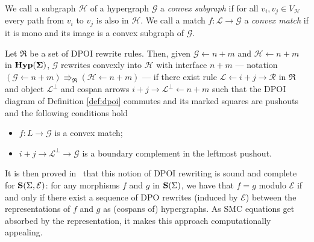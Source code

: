 \begin{definition}
We call a subgraph $\mathcal{H}$ of a hypergraph $\mathcal{G}$ a \emph{convex subgraph} if for all $v_i, v_j \in V_{\mathcal{H}}$ every path from $v_i$ to $v_j$ is also in $\mathcal{H}$.
We call a match $f : \mathcal L \to \mathcal G$ a \emph{convex match} if it is mono and its image is a convex subgraph of $\mathcal G$. 
   
\end{definition}

\begin{definition}
\label{def:convex_dpo}
Let $\mathfrak{R}$ be a set of DPOI rewrite rules. 
Then, given $\mathcal G \xleftarrow{} n+m$ and $\mathcal H \xleftarrow{} n + m$ in $\mathbf{Hyp(\Sigma)}$, $\mathcal G$ rewrites convexly into $\mathcal H$ with interface $n + m$ --- notation $(\mathcal G \xleftarrow{} n + m ) \Rrightarrow_{\mathfrak{R}}  (\mathcal H \xleftarrow{} n + m )$ --- if there exist rule $\mathcal L \xleftarrow{} i + j \xrightarrow{} \mathcal R$ in $\mathfrak{R}$ and object $\mathcal{L}^{\bot}$ and cospan arrows $i+j \xrightarrow{} \mathcal{L}^{\bot} \xleftarrow{} n+m$ such that the DPOI diagram of Definition \ref{def:dpoi} commutes and its marked squares are pushouts 
and the following conditions hold
\begin{itemize}
    \item $f : L \to \mathcal G$ is a convex match;
    \item $i + j \to \mathcal{L}^{\bot} \to \mathcal G$ is a boundary complement in the leftmost pushout.
\end{itemize}
\end{definition}
It is then proved in~\cite{bonchi_string_2022-2} that this notion of DPOI rewriting is sound and complete for $\mathbf{S}(\Sigma, \mathcal{E})$: for any morphisms $f$ and $g$ in $\mathbf{S}(\Sigma)$,  we have that $f = g$ modulo $\mathcal{E}$ if and only if there exist a sequence of DPO rewrites (induced by $\mathcal{E}$) between the representations of $f$ and $g$ as (cospans of) hypergraphs.
As SMC equations get absorbed by the representation, it makes this approach computationally appealing.
